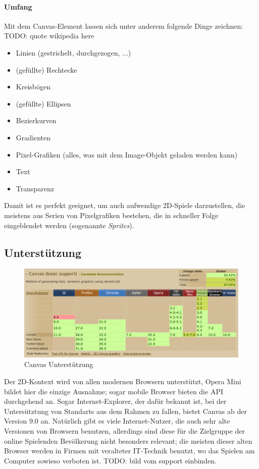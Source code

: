 \documentclass[a4paper, 12pt]{article}
\begin{document}
\paragraph{Umfang} Mit dem Canvas-Element lassen sich unter anderem folgende Dinge zeichnen:
TODO: quote wikipedia here
\begin{itemize}
	\item Linien (gestrichelt, durchgezogen, ...)
	\item (gefüllte) Rechtecke
	\item Kreisbögen
	\item (gefüllte) Ellipsen
	\item Bezierkurven
	\item Gradienten
	\item Pixel-Grafiken (alles, was mit dem Image-Objekt geladen werden kann)
	\item Text
	\item Transparenz
\end{itemize}
Damit ist es perfekt geeignet, um auch aufwendige 2D-Spiele darzustellen, die meistens aus Serien von Pixelgrafiken bestehen, die in schneller Folge eingeblendet werden (sogenannte \emph{Sprites}).
\subsection{Unterstützung}
\begin{figure}[H]
	\begin{center}
		\includegraphics[width=\textwidth]{assets/canvas_support.png} 
	\end{center}
	\caption{Canvas Unterstützung}
	\label{canvas_support}
\end{figure}
Der 2D-Kontext wird von allen modernen Browsern unterstützt, Opera Mini bildet hier die einzige Ausnahme; sogar mobile Browser bieten die API durchgehend an. Sogar Internet-Explorer, der dafür bekannt ist, bei der Untersütztung von Standarts aus dem Rahmen zu fallen, bietet Canvas ab der Version 9.0 an. Natürlich gibt es viele Internet-Nutzer, die auch sehr alte Versionen von Browsern benutzen, allerdings sind diese für die Zielgruppe der online Spielenden Bevölkerung nicht besonders relevant; die meisten dieser alten Browser werden in Firmen mit veralteter IT-Technik benutzt, wo das Spielen am Computer sowieso verboten ist.
TODO: bild vom support einbinden.
\end{document}
